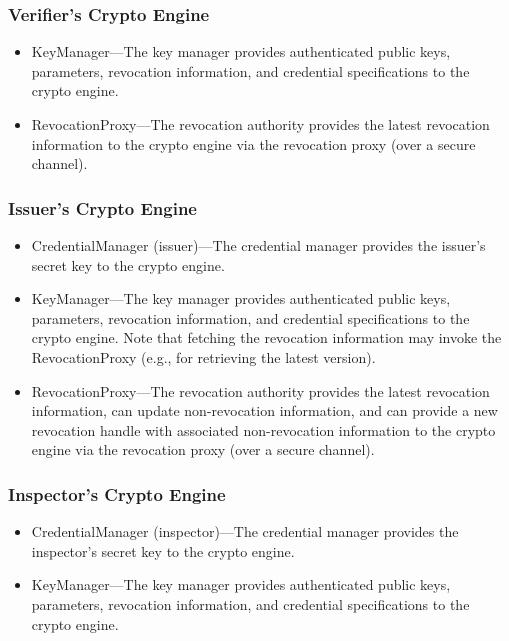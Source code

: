   \subsubsection{Verifier's Crypto Engine}
  \begin{itemize}
    \item KeyManager---The key manager provides authenticated public keys, parameters, revocation information, and credential specifications
      to the crypto engine.
    \item RevocationProxy---The revocation authority provides the latest revocation information to the crypto engine via the revocation proxy (over a secure channel).
  \end{itemize}

  \subsubsection{Issuer's Crypto Engine}
  \begin{itemize}
    \item CredentialManager (issuer)---The credential manager provides the issuer's secret key to the crypto engine.
    \item KeyManager---The key manager provides authenticated public keys, parameters, revocation information, and credential specifications
      to the crypto engine. Note that fetching the revocation information may invoke the RevocationProxy (e.g., for retrieving the latest version).
    \item RevocationProxy---The revocation authority provides the latest revocation information, can update non-revocation information,
      and can provide a new revocation handle with associated non-revocation information
      to the crypto engine via the revocation proxy (over a secure channel).
  \end{itemize}

  \subsubsection{Inspector's Crypto Engine}
  \begin{itemize}
    \item CredentialManager (inspector)---The credential manager provides the inspector's secret key to the crypto engine.
    \item KeyManager---The key manager provides authenticated public keys, parameters, revocation information, and credential specifications
      to the crypto engine.
  \end{itemize}

